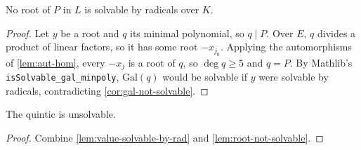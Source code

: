\begin{lemma}
  \label{lem:root-not-solvable}
  \leanok
  No root of $P$ in $L$ is solvable by radicals over $K$.
\end{lemma}

\begin{proof}
  \leanok
  Let $y$ be a root and $q$ its minimal polynomial, so $q \mid P$. Over $E$, $q$ divides a
  product of linear factors, so it has some root $-x_{j_0}$. Applying the automorphisms of
  \cref{lem:aut-hom}, every $-x_j$ is a root of $q$, so $\deg q \geq 5$ and $q = P$.
  By Mathlib's \texttt{isSolvable\_gal\_minpoly}, $\mathrm{Gal}(q)$ would be solvable if $y$
  were solvable by radicals, contradicting \cref{cor:gal-not-solvable}.
\end{proof}

\begin{theorem}
  \label{thm:galois-main}
  \leanok
  The quintic is unsolvable.
\end{theorem}

\begin{proof}
  \leanok
  Combine \cref{lem:value-solvable-by-rad} and \cref{lem:root-not-solvable}.
\end{proof}
